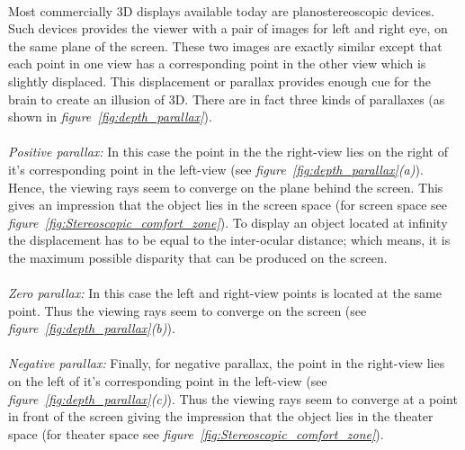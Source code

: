\paragraph{}
Most commercially 3D displays available today are planostereoscopic devices. Such devices provides the viewer with a pair of images for left and right eye, on the same plane of the screen. These two images are exactly similar except that each point in one view has a corresponding point in the other view which is slightly displaced. This displacement or parallax provides enough cue for the brain to create an illusion of 3D. There are in fact three kinds of parallaxes (as shown in \textit{figure~\ref{fig:depth_parallax}}).

\paragraph{}
\emph{Positive parallax: }In this case the point in the the right-view lies on the right of it's corresponding point in the left-view (see \textit{figure~\ref{fig:depth_parallax}(a)}). Hence, the viewing rays seem to converge on the plane behind the screen. This gives an impression that the object lies in the screen space (for screen space see \textit{figure~\ref{fig:Stereoscopic_comfort_zone}}). To display an object located at infinity the displacement has to be equal to the inter-ocular distance; which means, it is the maximum possible disparity that can be produced on the screen.

\paragraph{}
\emph{Zero parallax: }In this case the left and right-view points is located at the same point. Thus the viewing rays seem to converge on the screen (see \textit{figure~\ref{fig:depth_parallax}(b)}).

\paragraph{}
\emph{Negative parallax: }Finally, for negative parallax, the point in the right-view lies on the left of it's corresponding point in the left-view (see \textit{figure~\ref{fig:depth_parallax}(c)}). Thus the viewing rays seem to converge at a point in front of the screen giving the impression that the object lies in the theater space (for theater space see \textit{figure~\ref{fig:Stereoscopic_comfort_zone}}).


